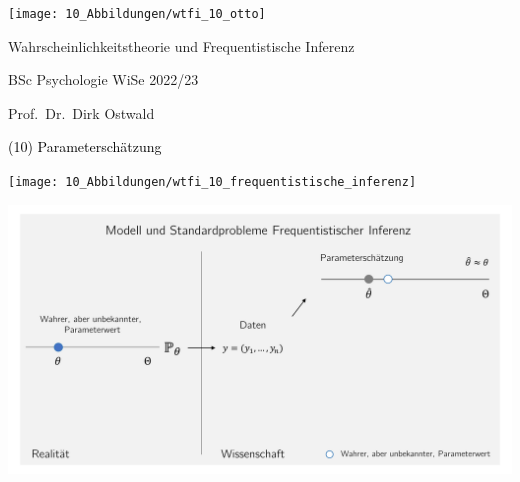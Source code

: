 \documentclass[
  8pt,
  ignorenonframetext,
]{beamer}
\author{}
\date{\vspace{-2.5em}}
\begin{document}
\begin{frame}[plain]{}
\protect\hypertarget{section}{}
\center

\begin{center}\texttt{[image: 10\_Abbildungen/wtfi\_10\_otto]} \end{center}

\vspace{2mm}

\Large

Wahrscheinlichkeitstheorie und Frequentistische Inferenz \vspace{6mm}

\large

BSc Psychologie WiSe 2022/23

\vspace{6mm}
\normalsize

Prof.~Dr.~Dirk Ostwald
\end{frame}

\begin{frame}[plain]{}
\protect\hypertarget{section-1}{}
\vfill
\center
\huge

\textcolor{black}{(10) Parameterschätzung} \vfill
\end{frame}

\begin{frame}{}
\protect\hypertarget{section-2}{}
\begin{center}\texttt{[image: 10\_Abbildungen/wtfi\_10\_frequentistische\_inferenz]} \end{center}
\end{frame}

\begin{frame}{}
\protect\hypertarget{section-3}{}
\begin{center}\includegraphics[width=1\linewidth]{10_Abbildungen/wtfi_10_frequentistische_inferenz_parameterschätzung} \end{center}
\end{frame}
\end{document}
